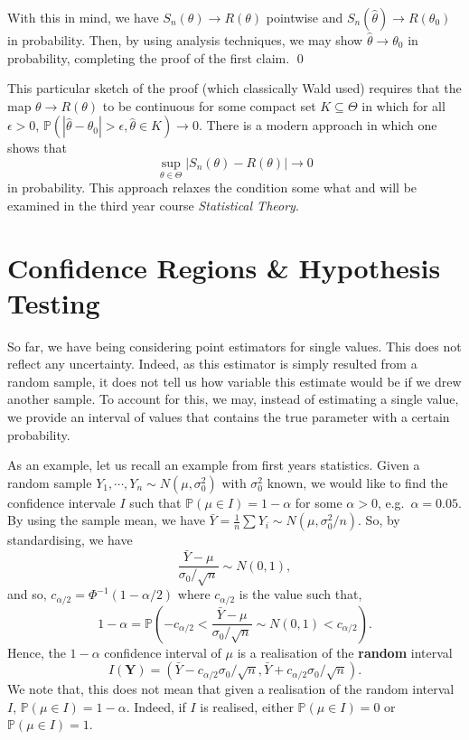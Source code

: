 \documentclass[
]{article}
\theoremstyle{definition}
\theoremstyle{definition}
\begin{document}
With this in mind, we have \(S_n(\theta) \to R(\theta)\) pointwise and
\(S_n(\hat{\theta}) \to R(\theta_0)\) in probability. Then, by using
analysis techniques, we may show \(\hat{\theta} \to \theta_0\) in
probability, completing the proof of the first claim. \qed

This particular sketch of the proof (which classically Wald used)
requires that the map \(\theta \to R(\theta)\) to be continuous for some
compact set \(K \subseteq \Theta\) in which for all \(\epsilon > 0\),
\(\mathbb{P}(|\hat{\theta} - \theta_0| > \epsilon, \hat{\theta} \in K) \to 0\).
There is a modern approach in which one shows that
\[\sup_{\theta \in \Theta} |S_n(\theta) - R(\theta)| \to 0\] in
probability. This approach relaxes the condition some what and will be
examined in the third year course \emph{Statistical Theory}.

\newpage

\hypertarget{confidence-regions-hypothesis-testing}{%
\section{Confidence Regions \& Hypothesis
Testing}\label{confidence-regions-hypothesis-testing}}

So far, we have being considering point estimators for single values.
This does not reflect any uncertainty. Indeed, as this estimator is
simply resulted from a random sample, it does not tell us how variable
this estimate would be if we drew another sample. To account for this,
we may, instead of estimating a single value, we provide an interval of
values that contains the true parameter with a certain probability.

As an example, let us recall an example from first years statistics.
Given a random sample \(Y_1, \cdots, Y_n \sim N(\mu, \sigma_0^2)\) with
\(\sigma^2_0\) known, we would like to find the confidence intervale
\(I\) such that \(\mathbb{P}(\mu \in I) = 1 - \alpha\) for some
\(\alpha > 0\), e.g.~\(\alpha = 0.05\). By using the sample mean, we
have \(\bar{Y} = \frac{1}{n} \sum Y_i \sim N(\mu, \sigma_0^2 / n)\). So,
by standardising, we have
\[\frac{\bar{Y} - \mu}{\sigma_0 / \sqrt{n}} \sim N(0, 1),\] and so,
\(c_{\alpha / 2} = \Phi^{-1}(1 - \alpha / 2)\) where \(c_{\alpha / 2}\)
is the value such that,
\[1 - \alpha =  \mathbb{P}\left(- c_{\alpha / 2} < 
  \frac{\bar{Y} - \mu}{\sigma_0 / \sqrt{n}} \sim N(0, 1) < c_{\alpha / 2} \right).\]
Hence, the \(1 - \alpha\) confidence interval of \(\mu\) is a
realisation of the \textbf{random} interval
\[I(\mathbf{Y}) = (\bar{Y} - c_{\alpha / 2} \sigma_0 / \sqrt{n}, 
  \bar{Y} + c_{\alpha / 2} \sigma_0 / \sqrt{n}).\] We note that, this
does not mean that given a realisation of the random interval \(I\),
\(\mathbb{P}(\mu \in I) = 1 - \alpha\). Indeed, if \(I\) is realised,
either \(\mathbb{P}(\mu \in I) = 0\) or \(\mathbb{P}(\mu \in I) = 1\).
\end{document}
